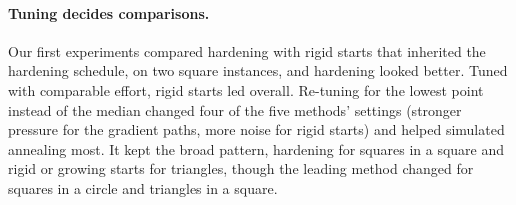 \paragraph{Tuning decides comparisons.} Our first experiments compared hardening with rigid starts that inherited the hardening schedule, on two square instances, and hardening looked better. Tuned with comparable effort, rigid starts led overall. Re-tuning for the lowest point instead of the median changed four of the five methods' settings (stronger pressure for the gradient paths, more noise for rigid starts) and helped simulated annealing most. It kept the broad pattern, hardening for squares in a square and rigid or growing starts for triangles, though the leading method changed for squares in a circle and triangles in a square.

